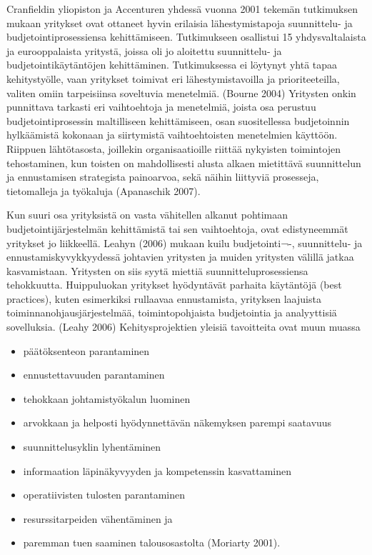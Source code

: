 \documentclass[12pt,a4paper,oneside,pdftex]{report}
\begin{document}
Cranfieldin yliopiston ja Accenturen yhdessä vuonna 2001 tekemän tutkimuksen mukaan yritykset ovat ottaneet hyvin erilaisia lähestymistapoja suunnittelu- ja budjetointiprosessiensa kehittämiseen. Tutkimukseen osallistui 15 yhdysvaltalaista ja eurooppalaista yritystä, joissa oli jo aloitettu suunnittelu- ja budjetointikäytäntöjen kehittäminen. Tutkimuksessa ei löytynyt yhtä tapaa kehitystyölle, vaan yritykset toimivat eri lähestymistavoilla ja prioriteeteilla, valiten omiin tarpeisiinsa soveltuvia menetelmiä. (Bourne 2004) Yritysten onkin punnittava tarkasti eri vaihtoehtoja ja menetelmiä, joista osa perustuu budjetointiprosessin maltilliseen kehittämiseen, osan suositellessa budjetoinnin hylkäämistä kokonaan ja siirtymistä vaihtoehtoisten menetelmien käyttöön. Riippuen lähtötasosta, joillekin organisaatioille riittää nykyisten toimintojen tehostaminen, kun toisten on mahdollisesti alusta alkaen mietittävä suunnittelun ja ennustamisen strategista painoarvoa, sekä näihin liittyviä prosesseja, tietomalleja ja työkaluja (Apanaschik 2007).

Kun suuri osa yrityksistä on vasta vähitellen alkanut pohtimaan budjetointijärjestelmän kehittämistä tai sen vaihtoehtoja, ovat edistyneemmät yritykset jo liikkeellä. Leahyn (2006) mukaan kuilu budjetointi¬-, suunnittelu- ja ennustamiskyvykkyydessä johtavien yritysten ja muiden yritysten välillä jatkaa kasvamistaan. Yritysten on siis syytä miettiä suunnitteluprosessiensa tehokkuutta.  Huippuluokan yritykset hyödyntävät parhaita käytäntöjä (best practices), kuten esimerkiksi rullaavaa ennustamista, yrityksen laajuista toiminnanohjausjärjestelmää, toimintopohjaista budjetointia ja analyyttisiä sovelluksia. (Leahy 2006) Kehitysprojektien yleisiä tavoitteita ovat muun muassa

\begin{itemize}
\setlength{\itemsep}{0pt}
\item päätöksenteon parantaminen
\item ennustettavuuden parantaminen
\item tehokkaan johtamistyökalun luominen
\item arvokkaan ja helposti hyödynnettävän näkemyksen parempi saatavuus
\item suunnittelusyklin lyhentäminen
\item informaation läpinäkyvyyden ja kompetenssin kasvattaminen
\item operatiivisten tulosten parantaminen
\item resurssitarpeiden vähentäminen ja
\item paremman tuen saaminen talousosastolta (Moriarty 2001).
\end{itemize}
\end{document}
